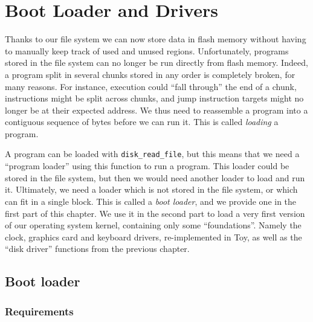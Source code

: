 
\renewcommand{\rustfile}{chapter2}
\setcounter{rustid}{0}


\chapter{Boot Loader and Drivers}\label{chapter:boot-loader-and-drivers}

Thanks to our file system we can now store data in flash memory without having
to manually keep track of used and unused regions. Unfortunately, programs
stored in the file system can no longer be run directly from flash memory.
Indeed, a program split in several chunks stored in any order is completely
broken, for many reasons. For instance, execution could ``fall through'' the
end of a chunk, instructions might be split across chunks, and jump instruction
targets might no longer be at their expected address. We thus need to
reassemble a program into a contiguous sequence of bytes before we can run it.
This is called {\em loading} a program.

A program can be loaded with {\tt disk\_read\_file}, but this means that we
need a ``program loader'' using this function to run a program. This loader
could be stored in the file system, but then we would need another loader to
load and run it. Ultimately, we need a loader which is not stored in the file
system, or which can fit in a single block. This is called a {\em boot loader},
and we provide one in the first part of this chapter. We use it in the second
part to load a very first version of our operating system kernel, containing
only some ``foundations''. Namely the clock, graphics card and keyboard drivers,
re-implemented in Toy, as well as the ``disk driver'' functions from the
previous chapter.

\section{Boot loader}

\subsection{Requirements}

